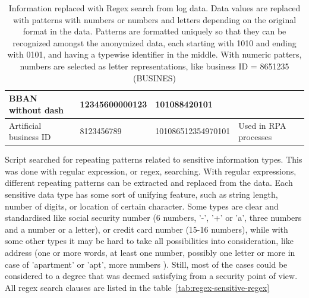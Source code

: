 \begin{table}[]
\begin{tabularx}{\textwidth}{|L{0.17\textwidth}|L{0.27\textwidth}|L{0.30\textwidth}|Y|}
        BBAN without dash &
        12345600000123 &
        101088420101 &
        \\ \hline
        Artificial business ID &
        8123456789 &
        101086512354970101 &
        Used in RPA processes
        \\ \hline
    \end{tabularx}
    \caption{Information replaced with Regex search from log data.
        Data values are replaced with patterns with numbers or numbers and letters
        depending on the original format in the data.
        Patterns are formatted uniquely so that they can be recognized amongst the anonymized data,
        each starting with 1010 and ending with 0101,
        and having a typewise identifier in the middle.
        With numeric patters,
        numbers are selected as letter representations,
        like business ID = 8651235 (BUSINES)}
    \label{tab:regex-sensitive-info}
\end{table}

Script searched for repeating patterns related to sensitive information types.
This was done with regular expression, or regex, searching.
With regular expressions,
different repeating patterns can be extracted and replaced from the data.
Each sensitive data type has some sort of unifying feature,
such as string length, number of digits, or location of certain character.\cite{li2008regular}
Some types are clear and standardised like social security number
(6 numbers, '-', '+' or 'a', three numbers and a number or a letter),
or credit card number (15-16 numbers),
while with some other types it may be hard
to take all possibilities into consideration,
like address (one or more words, at least one number,
possibly one letter or more in case of 'apartment' or 'apt', more numbers \etc).
Still,
most of the cases could be considered to a degree
that was deemed satisfying from a security point of view.
All regex search clauses are listed in the table~\ref{tab:regex-sensitive-regex}


